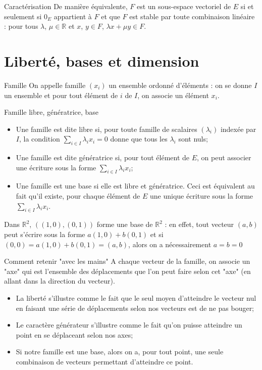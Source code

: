 \documentclass{classe}
\begin{document}
\begin{théorème}{Caractérisation}{}
	De manière équivalente, $F$ est un sous-espace vectoriel de $E$ si et seulement si $0_E$ appartient à $F$ et que $F$ est stable par toute combinaison linéaire : pour tous $\lambda$, $\mu \in \mathbb{R}$ et $x$, $y\in F$, $\lambda x + \mu y \in F$.
\end{théorème}

\section{Liberté, bases et dimension}

\begin{définition}{Famille}{}
On appelle famille $(x_i)$ un ensemble ordonné d'éléments : on se donne $I$ un ensemble et pour tout élément de $i$ de $I$, on associe un élément $x_i$.
\end{définition}

\begin{définition}{Famille libre, génératrice, base}{}
\begin{itemize}
\item Une famille est dite libre si, pour toute famille de scalaires $(\lambda_i)$ indexée par $I$, la condition $\sum_{i\in I} \lambda_i x_i = 0$ donne que tous les $\lambda_i$ sont nuls;
\item Une famille est dite génératrice si, pour tout élément de $E$, on peut associer une écriture sous la forme $\sum_{i\in I} \lambda_i x_i$;
\item Une famille est une base si elle est libre et génératrice. Ceci est équivalent au fait qu'il existe, pour chaque élément de $E$ une unique écriture sous la forme $\sum_{i\in I} \lambda_i x_i$.
\end{itemize}
\end{définition}

\begin{example}
Dans $\mathbb{R}^2$, $((1, 0),(0, 1))$ forme une base de $\mathbb{R}^2$ : en effet, tout vecteur $(a, b)$ peut s'écrire sous la forme $a(1, 0) + b(0, 1)$ et si $(0, 0) = a(1, 0) + b(0, 1) = (a, b)$, alors on a nécessairement $a=b=0$
\end{example}

\begin{remarque}{Comment retenir "avec les mains"}{}
A chaque vecteur de la famille, on associe un "axe" qui est l'ensemble des déplacements que l'on peut faire selon cet "axe" (en allant dans la direction du vecteur).
\begin{itemize}
	\item La liberté s'illustre comme le fait que le seul moyen d'atteindre le vecteur nul en faisant une série de déplacements selon nos vecteurs est de ne pas bouger;
	\item Le caractère générateur s'illustre comme le fait qu'on puisse atteindre un point en se déplaceant selon nos axes;
	\item Si notre famille est une base, alors on a, pour tout point, une seule combinaison de vecteurs permettant d'atteindre ce point.
\end{itemize}
\end{remarque}
\end{document}
